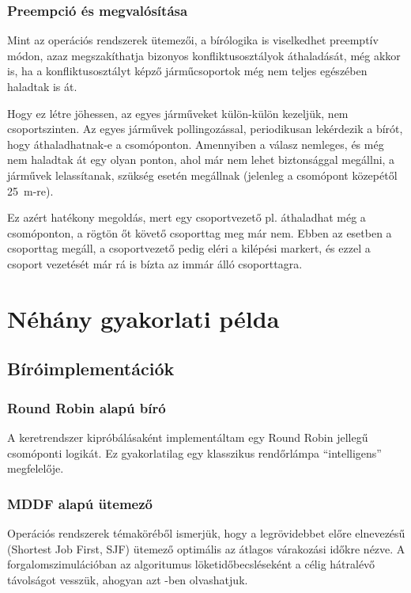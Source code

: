 \documentclass{article}
\begin{document}
		\subsubsection{Preempció és megvalósítása}
			Mint az operációs rendszerek ütemezői, a bírólogika is viselkedhet preemptív módon, azaz megszakíthatja bizonyos konfliktusosztályok áthaladását, még akkor is, ha a konfliktusosztályt képző járműcsoportok még nem teljes egészében haladtak is át.
			
			Hogy ez létre jöhessen, az egyes járműveket külön-külön kezeljük, nem csoportszinten. Az egyes járművek pollingozással, periodikusan lekérdezik a bírót, hogy áthaladhatnak-e a csomóponton. Amennyiben a válasz nemleges, és még nem haladtak át egy olyan ponton, ahol már nem lehet biztonsággal megállni, a járművek lelassítanak, szükség esetén megállnak (jelenleg a csomópont közepétől 25~m-re).
			
			Ez azért hatékony megoldás, mert egy csoportvezető pl. áthaladhat még a csomóponton, a rögtön őt követő csoporttag meg már nem. Ebben az esetben a csoporttag megáll, a csoportvezető pedig eléri a kilépési markert, és ezzel a csoport vezetését már rá is bízta az immár álló csoporttagra.
			
	\section{Néhány gyakorlati példa}
		\subsection{Bíróimplementációk}
			\subsubsection{Round Robin alapú bíró}
				A keretrendszer kipróbálásaként implementáltam egy Round Robin jellegű csomóponti logikát. Ez gyakorlatilag egy klasszikus rendőrlámpa ``intelligens'' megfelelője.
				
			\subsubsection{MDDF alapú ütemező}
				Operációs rendszerek témaköréből ismerjük, hogy a legrövidebbet előre elnevezésű (Shortest Job First, SJF) ütemező optimális az átlagos várakozási időkre nézve. A forgalomszimulációban az algoritumus löketidőbecsléseként a célig hátralévő távolságot vesszük, ahogyan azt -ben olvashatjuk.
				
\end{document}
